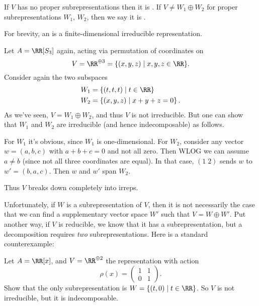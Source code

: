 \begin{definition}
	If $V$ has no proper subrepresentations then it is .
	If $V \neq W_1 \oplus W_2$ for proper subrepresentations $W_1$, $W_2$,
	then we say it is .
\end{definition}
\begin{definition}
	For brevity, an  is a
	finite-dimensional irreducible representation.
\end{definition}

\begin{example}
	Let $A = \RR[S_3]$ again, acting via permutation of coordinates on
	\[ V = \RR^{\oplus 3} = \{ (x,y,z) \mid x,y,z \in \RR \}. \]
	Consider again the two subspaces
	\begin{align*}
		W_1 &= \left\{ (t,t,t) \mid t \in \RR \right\} \\
		W_2 &= \left\{ (x,y,z) \mid x+y+z = 0 \right\}.
	\end{align*}
	As we've seen, $V = W_1 \oplus W_2$, and thus $V$ is not irreducible.
	But one can show that $W_1$ and $W_2$ are irreducible 
	(and hence indecomposable) as follows.
	\begin{itemize}
		\ii For $W_1$ it's obvious, since $W_1$ is one-dimensional.
		\ii For $W_2$, consider any vector $w = (a,b,c)$
		with $a+b+c=0$ and not all zero.  Then WLOG we can assume $a \neq b$ 
		(since not all three coordinates are equal).
		In that case, $(1 \; 2)$ sends $w$ to $w' = (b,a,c)$.
		Then $w$ and $w'$ span $W_2$.
	\end{itemize}
	Thus $V$ breaks down completely into irreps.
\end{example}

Unfortunately, if $W$ is a subrepresentation of $V$,
then it is not necessarily the case that we can find a
supplementary vector space $W'$ such that $V = W \oplus W'$.
Put another way, if $V$ is reducible, we know that it has a subrepresentation,
but a decomposition requires \emph{two} subrepresentations.
Here is a standard counterexample:
\begin{exercise}
	Let $A = \RR[x]$, and $V = \RR^{\oplus 2}$ the representation with action
	\[ \rho(x) = \begin{pmatrix} 1 & 1 \\ 0 & 1 \end{pmatrix}. \]
	Show that the only subrepresentation is $W = \{ (t,0) \mid t \in \RR \}$.
	So $V$ is not irreducible, but it is indecomposable.
\end{exercise}

